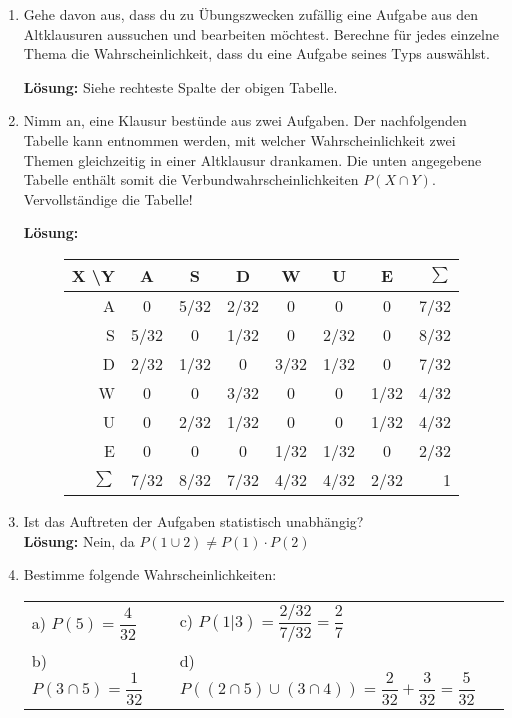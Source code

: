 \documentclass[11pt, a4paper]{article}
\begin{document}
\begin{enumerate}[label=\alph*)]
\item Gehe  davon aus, dass du zu Übungszwecken zufällig eine Aufgabe aus den Altklausuren aussuchen und bearbeiten möchtest. Berechne für jedes einzelne Thema die Wahrscheinlichkeit, dass du eine Aufgabe seines Typs auswählst.

\textbf{Lösung:} Siehe rechteste Spalte der obigen Tabelle.
\item Nimm an, eine Klausur bestünde aus zwei Aufgaben. Der nachfolgenden Tabelle kann entnommen werden, mit welcher Wahrscheinlichkeit zwei Themen gleichzeitig in einer Altklausur drankamen. Die unten angegebene Tabelle enthält somit die Verbundwahrscheinlichkeiten $P(X \cap Y)$. Vervollständige die Tabelle!

\textbf{Lösung:}
\begin{figure}[h!]
\centering
\setlength\extrarowheight{5pt}
\begin{tabular}{r|cccccc|r}
	X \textbackslash	Y	& A 	& S 	& D 	& W 	& U 	& E 	& $\sum$\\ \hline
	A 		& 0 	& 5/32 	& \textcolor{AI-BLUE}{2/32} 	& 0  	& 0  	& 0 	& 7/32 \\
	S 		& 5/32	& 0		& 1/32 	& 0 	& \textcolor{AI-BLUE}{2/32} 	& \textcolor{AI-BLUE}{0} 	& 8/32 \\
	D 		& \textcolor{AI-BLUE}{2/32}	& 1/32 	& 0 	& 3/32 	& 1/32 	& 0  	& 7/32 \\
	W 		& 0		& 0 	& 3/32 	& 0 	& 0  	& \textcolor{AI-BLUE}{1/32} 	& 4/32 \\
	U 		& 0  	& \textcolor{AI-BLUE}{2/32} 	& 1/32 	& 0 	& 0  	& 1/32 	& 4/32 \\
	E 		& 0 	& \textcolor{AI-BLUE}{0} 	& 0  	& \textcolor{AI-BLUE}{1/32} 	& 1/32 	& 0 	& 2/32 \\ \hline
	$\sum$ 	& 7/32 	& 8/32 	& 7/32 	& 4/32 	& 4/32 	& 2/32  & 1\\
\end{tabular}
\end{figure}


\item Ist das Auftreten der Aufgaben statistisch unabhängig?\\
\textbf{Lösung:} Nein, da $P(1 \cup 2) \neq P(1) \cdot P(2)$
\item Bestimme folgende Wahrscheinlichkeiten:

	\begin{tabular}{ll}
	a) $P(5) = \dfrac{4}{32}$ \hspace{4cm} 				& c) $P(1|3) = \dfrac{2/32}{7/32} = \dfrac{2}{7}$ \\
	b) $P(3 \cap 5) = \dfrac{1}{32}$ 					& d) $P((2\cap 5) \cup (3\cap 4)) = \dfrac{2}{32} + \dfrac{3}{32} = \dfrac{5}{32}$\\
	\end{tabular}
	

\end{enumerate}
\end{document}
